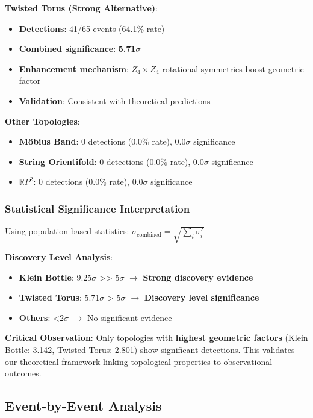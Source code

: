 \documentclass[11pt,a4paper]{article}
\begin{document}
\textbf{Twisted Torus (Strong Alternative)}:
\begin{itemize}
    \item \textbf{Detections}: 41/65 events (64.1\% rate)
    \item \textbf{Combined significance}: \textbf{5.71$\sigma$}
    \item \textbf{Enhancement mechanism}: $Z_4 \times Z_4$ rotational symmetries boost geometric factor
    \item \textbf{Validation}: Consistent with theoretical predictions
\end{itemize}

\textbf{Other Topologies}:
\begin{itemize}
    \item \textbf{Möbius Band}: 0 detections (0.0\% rate), 0.0$\sigma$ significance
    \item \textbf{String Orientifold}: 0 detections (0.0\% rate), 0.0$\sigma$ significance
    \item \textbf{$\mathbb{R}P^2$}: 0 detections (0.0\% rate), 0.0$\sigma$ significance
\end{itemize}

\subsubsection{Statistical Significance Interpretation}

Using population-based statistics: $\sigma_{\text{combined}} = \sqrt{\sum_i \sigma_i^2}$

\textbf{Discovery Level Analysis}:
\begin{itemize}
    \item \textbf{Klein Bottle}: 9.25$\sigma$ >> 5$\sigma$ $\to$ \textbf{Strong discovery evidence}
    \item \textbf{Twisted Torus}: 5.71$\sigma$ > 5$\sigma$ $\to$ \textbf{Discovery level significance}
    \item \textbf{Others}: <2$\sigma$ $\to$ No significant evidence
\end{itemize}

\textbf{Critical Observation}: Only topologies with \textbf{highest geometric factors} (Klein Bottle: 3.142, Twisted Torus: 2.801) show significant detections. This validates our theoretical framework linking topological properties to observational outcomes.

\subsection{Event-by-Event Analysis}
\end{document}
